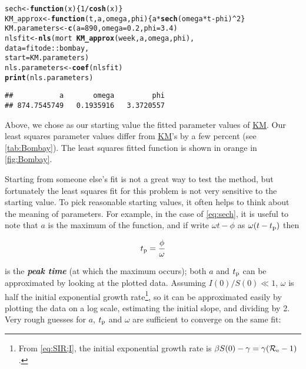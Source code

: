 \documentclass[]{interact}\usepackage[]{graphicx}\usepackage[]{xcolor}
\makeatletter
\newcommand{\hlnum}[1]{\textcolor[rgb]{0.686,0.059,0.569}{#1}}%
\newcommand{\hlopt}[1]{\textcolor[rgb]{0,0,0}{#1}}%
\newcommand{\hlstd}[1]{\textcolor[rgb]{0.345,0.345,0.345}{#1}}%
\newcommand{\hlkwa}[1]{\textcolor[rgb]{0.161,0.373,0.58}{\textbf{#1}}}%
\newcommand{\hlkwb}[1]{\textcolor[rgb]{0.69,0.353,0.396}{#1}}%
\newcommand{\hlkwc}[1]{\textcolor[rgb]{0.333,0.667,0.333}{#1}}%
\newcommand{\hlkwd}[1]{\textcolor[rgb]{0.737,0.353,0.396}{\textbf{#1}}}%
\newenvironment{kframe}{%
 \def\at@end@of@kframe{}%
 \ifinner\ifhmode%
  \def\at@end@of@kframe{\end{minipage}}%
  \begin{minipage}{\columnwidth}%
 \fi\fi%
 \def\FrameCommand##1{\hskip\@totalleftmargin \hskip-\fboxsep
 \colorbox{shadecolor}{##1}\hskip-\fboxsep
     \hskip-\linewidth \hskip-\@totalleftmargin \hskip\columnwidth}%
 \MakeFramed {\advance\hsize-\width
   \@totalleftmargin\z@ \linewidth\hsize
   \@setminipage}}%
 {\par\unskip\endMakeFramed%
 \at@end@of@kframe}
\newenvironment{knitrout}{}{} %
\theoremstyle{plain}%
\theoremstyle{definition}
\theoremstyle{remark}
\newcommand{\term}[1]{{\bfseries\slshape#1}}
\newcommand{\tpeak}{t_{\rm p}}
\newcommand{\R}{{\mathcal R}}
\newcommand{\Reff}{\R_{\rm e}}
\newcommand{\KM}{\protect\hyperlink{cite.KermMcKe27}{KM}\xspace}
\newcommand{\nlscol}{orange\xspace}  %
\newcommand{\Sinit}{S(0)}
\newcommand{\Iinit}{I(0)}
\makeatother
\begin{document}
\begin{knitrout}
\color{fgcolor}\begin{kframe}
\begin{alltt}
\hlstd{sech} \hlkwb{<-} \hlkwa{function}\hlstd{(}\hlkwc{x}\hlstd{) \{}\hlnum{1}\hlopt{/}\hlkwd{cosh}\hlstd{(x)\}}
\hlstd{KM_approx} \hlkwb{<-} \hlkwa{function}\hlstd{(}\hlkwc{t}\hlstd{,} \hlkwc{a}\hlstd{,} \hlkwc{omega}\hlstd{,} \hlkwc{phi}\hlstd{) \{a} \hlopt{*} \hlkwd{sech}\hlstd{(omega}\hlopt{*}\hlstd{t} \hlopt{-} \hlstd{phi)}\hlopt{^}\hlnum{2}\hlstd{\}}
\hlstd{KM.parameters} \hlkwb{<-} \hlkwd{c}\hlstd{(}\hlkwc{a} \hlstd{=} \hlnum{890}\hlstd{,} \hlkwc{omega} \hlstd{=} \hlnum{0.2}\hlstd{,} \hlkwc{phi} \hlstd{=} \hlnum{3.4}\hlstd{)}
\hlstd{nlsfit} \hlkwb{<-} \hlkwd{nls}\hlstd{(mort} \hlopt{~} \hlkwd{KM_approx}\hlstd{(week, a, omega, phi),}
              \hlkwc{data} \hlstd{= fitode}\hlopt{::}\hlstd{bombay,}
              \hlkwc{start} \hlstd{= KM.parameters)}
\hlstd{nls.parameters} \hlkwb{<-} \hlkwd{coef}\hlstd{(nlsfit)}
\hlkwd{print}\hlstd{(nls.parameters)}
\end{alltt}
\begin{verbatim}
##           a       omega         phi 
## 874.7545749   0.1935916   3.3720557
\end{verbatim}
\end{kframe}
\end{knitrout}

\noindent
Above, we chose as our starting value the fitted parameter values of
\KM.  Our least squares parameter values differ from \KM's by a few
percent (see \cref{tab:Bombay}).  The least squares fitted
function is shown in \nlscol in \cref{fig:Bombay}.

Starting from someone else's fit is not a great way to test the
method, but fortunately the least squares fit for this problem is not
very sensitive to the starting value.
To pick reasonable starting values, it often helps to think about the
meaning of parameters.  For example, in the case of \cref{eq:sech}, it
is useful to note that $a$ is the maximum of the function, and if
write $\omega t - \phi$ as $\omega(t-\tpeak)$ then
\begin{linenomath*}
  \begin{equation}\label{eq:tpeak}
    \tpeak = \frac{\phi}{\omega}
  \end{equation}
\end{linenomath*}
is the \term{peak time} (at which the maximum occurs); both $a$ and
$\tpeak$ can be approximated by looking at the plotted data.  Assuming
$\Iinit/\Sinit\ll1$, $\omega$ is half the initial exponential growth
rate\footnote{From \cref{eq:SIR;I}, the initial exponential growth
rate is $\beta \Sinit - \gamma = \gamma(\Reff-1)$.}, so it can be
approximated easily by plotting the data on a log scale, estimating
the initial slope, and dividing by 2.  Very rough guesses for $a$,
$\tpeak$ and $\omega$ are sufficient to converge on the same fit:
\end{document}
